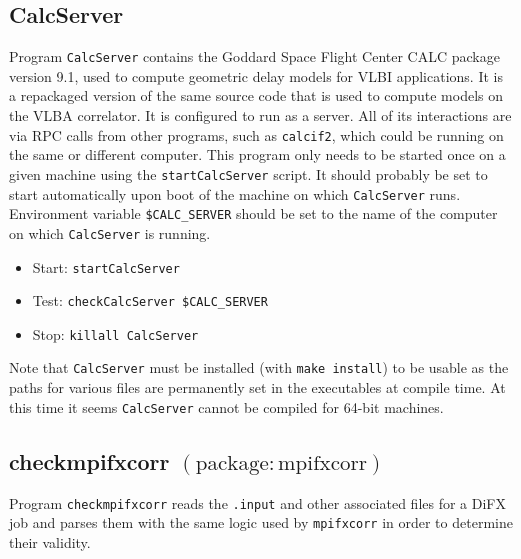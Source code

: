 
\subsection{CalcServer} \label{sec:CalcServer}

Program {\tt CalcServer} contains the Goddard Space Flight Center CALC package version 9.1, used to compute geometric delay models for VLBI applications.
It is a repackaged version of the same source code that is used to compute models on the VLBA correlator.
It is configured to run as a server.
All of its interactions are via RPC calls from other programs, such as {\tt calcif2}, which could be running on the same or different computer.
\newcommand{\oa}[1]{\hspace{-12pt}\makebox[12pt]{$\star$}#1}
This program only needs to be started once on a given machine using the {\tt startCalcServer} script.
It should probably be set to start automatically upon boot of the machine on which {\tt CalcServer} runs.
Environment variable {\tt \$CALC\_SERVER} should be set to the name of the computer on which {\tt CalcServer} is running.

\begin{itemize}
\item[] Start: {\tt startCalcServer}
\item[] Test: {\tt checkCalcServer \$CALC\_SERVER}
\item[] Stop: {\tt killall CalcServer}
\end{itemize}

\noindent
Note that {\tt CalcServer} must be installed (with {\tt make install}) to be usable as the paths for various files are permanently set in the executables at compile time.
At this time it seems {\tt CalcServer} cannot be compiled for 64-bit machines.








\subsection{checkmpifxcorr {\small $\mathrm{(package: mpifxcorr)}$}}

Program {\tt checkmpifxcorr} reads the {\tt .input} and other associated files for a DiFX job and parses them with the same logic used by {\tt mpifxcorr} in order to determine their validity.


